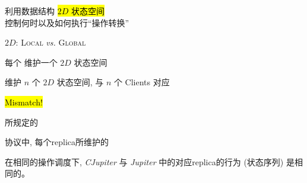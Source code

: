\begin{frame}{}
  \begin{center}
    \resizebox{0.75\textwidth}{!}{}
  \end{center}
\end{frame}

\begin{frame}{}
  \begin{center}
    {\large 利用数据结构 \hl{$2D$ 状态空间}~ \\
    控制何时以及如何执行``操作转换''}
  \end{center}


  \begin{center}
    $2D$: {\textsc{Local}} \emph{vs.} \textsc{Global}
  \end{center}
\end{frame}

\begin{frame}{}
  \centerline{\large 每个  维护一个 $2D$ 状态空间}


  \centerline{\large {} 维护 $n$ 个 $2D$ 状态空间, 与 $n$ 个 Clients 对应}
\end{frame}

\begin{frame}{}
  \begin{center}
    \hl{\Huge Mismatch!}

    \vspace{1.00cm}
    {\large \blue{\wlspec{}} 所规定的}

    \vspace{0.20cm}
    \vspace{0.20cm}

    {\large {} 协议中, 每个replica所维护的}
  \end{center}
\end{frame}

\begin{frame}{}
  \centerline{\LARGE {}}

  \pause
  \vspace{1.0cm}
  \begin{ctheorem}[等价性]
    在相同的操作调度下, \emph{CJupiter} 与 \emph{Jupiter} 中的对应replica的行为 {\small (状态序列)} 是相同的。
  \end{ctheorem}
\end{frame}

